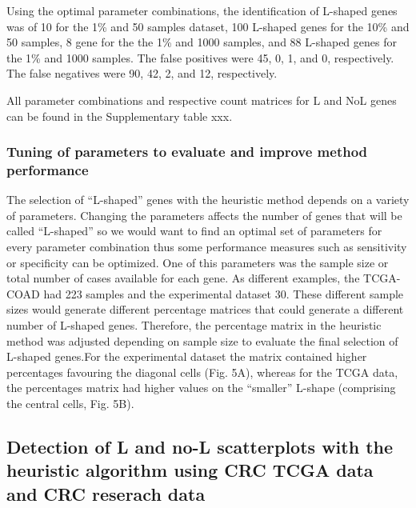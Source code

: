 \documentclass[10pt,letterpaper]{article}
\begin{document}
Using the optimal parameter combinations, the identification of L-shaped
genes was of 10 for the 1\% and 50 samples dataset, 100 L-shaped genes
for the 10\% and 50 samples, 8 gene for the the 1\% and 1000 samples,
and 88 L-shaped genes for the 1\% and 1000 samples. The false positives
were 45, 0, 1, and 0, respectively. The false negatives were 90, 42, 2,
and 12, respectively.

All parameter combinations and respective count matrices for L and NoL
genes can be found in the Supplementary table xxx.

\hypertarget{tuning-of-parameters-to-evaluate-and-improve-method-performance}{%
\subsubsection{Tuning of parameters to evaluate and improve method
performance}\label{tuning-of-parameters-to-evaluate-and-improve-method-performance}}

The selection of ``L-shaped'' genes with the heuristic method depends on
a variety of parameters. Changing the parameters affects the number of
genes that will be called ``L-shaped'' so we would want to find an
optimal set of parameters for every parameter combination thus some
performance measures such as sensitivity or specificity can be
optimized. One of this parameters was the sample size or total number of
cases available for each gene. As different examples, the TCGA-COAD had
223 samples and the experimental dataset 30. These different sample
sizes would generate different percentage matrices that could generate a
different number of L-shaped genes. Therefore, the percentage matrix in
the heuristic method was adjusted depending on sample size to evaluate
the final selection of L-shaped genes.For the experimental dataset the
matrix contained higher percentages favouring the diagonal cells (Fig.
5A), whereas for the TCGA data, the percentages matrix had higher values
on the ``smaller'' L-shape (comprising the central cells, Fig. 5B).

\hypertarget{detection-of-l-and-no-l-scatterplots-with-the-heuristic-algorithm-using-crc-tcga-data-and-crc-reserach-data}{%
\subsection{Detection of L and no-L scatterplots with the heuristic
algorithm using CRC TCGA data and CRC reserach
data}\label{detection-of-l-and-no-l-scatterplots-with-the-heuristic-algorithm-using-crc-tcga-data-and-crc-reserach-data}}
\end{document}

